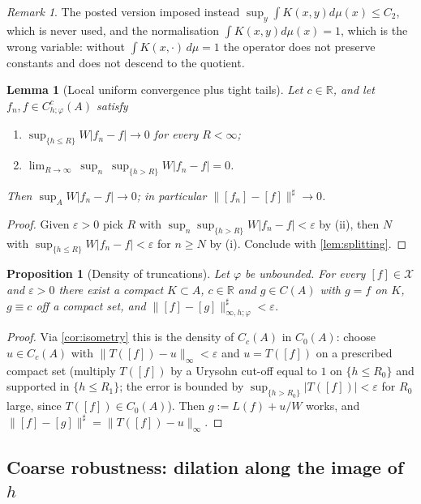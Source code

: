 \documentclass[11pt,a4paper]{article}
\numberwithin{equation}{section}
\theoremstyle{plain}
\newtheorem{proposition}[theorem]{Proposition}
\newtheorem{lemma}[theorem]{Lemma}
\theoremstyle{definition}
\theoremstyle{remark}
\newtheorem{remark}[theorem]{Remark}
\newcommand{\R}{\mathbb{R}}
\newcommand{\Cz}{C_0}
\newcommand{\Xdec}{\mathcal{X}}
\begin{document}
\begin{remark}
The posted version imposed instead $\sup_y\int K(x,y)d\mu(x)\le C_2$, which is never used,
and the normalisation $\int K(x,y)d\mu(x)=1$, which is the wrong variable: without
$\int K(x,\cdot)\,d\mu=1$ the operator does not preserve constants and does not descend
to the quotient.
\end{remark}

\begin{lemma}[Local uniform convergence plus tight tails]\label{lem:dini}
Let $c\in\R$, and let $f_n,f\in C^{c}_{h;\varphi}(A)$ satisfy
\begin{enumerate}
\item[(i)] $\sup_{\{h\le R\}}W|f_n-f|\to0$ for every $R<\infty$;
\item[(ii)] $\lim_{R\to\infty}\ \sup_{n}\ \sup_{\{h>R\}}W|f_n-f|=0$.
\end{enumerate}
Then $\sup_AW|f_n-f|\to0$; in particular $\|[f_n]-[f]\|^{\sharp}\to0$.
\end{lemma}

\begin{proof}
Given $\varepsilon>0$ pick $R$ with $\sup_n\sup_{\{h>R\}}W|f_n-f|<\varepsilon$ by (ii),
then $N$ with $\sup_{\{h\le R\}}W|f_n-f|<\varepsilon$ for $n\ge N$ by (i). Conclude with
\cref{lem:splitting}.
\end{proof}

\begin{proposition}[Density of truncations]\label{prop:truncation}
Let $\varphi$ be unbounded. For every $[f]\in\Xdec$ and $\varepsilon>0$ there exist a
compact $K\subset A$, $c\in\R$ and $g\in C(A)$ with $g=f$ on $K$, $g\equiv c$ off a compact
set, and $\|[f]-[g]\|^{\sharp}_{\infty,h;\varphi}<\varepsilon$.
\end{proposition}

\begin{proof}
Via \cref{cor:isometry} this is the density of $C_c(A)$ in $\Cz(A)$: choose
$u\in C_c(A)$ with $\|T([f])-u\|_\infty<\varepsilon$ and $u=T([f])$ on a prescribed
compact set (multiply $T([f])$ by a Urysohn cut-off equal to $1$ on $\{h\le R_0\}$ and
supported in $\{h\le R_1\}$; the error is bounded by $\sup_{\{h>R_0\}}|T([f])|<\varepsilon$
for $R_0$ large, since $T([f])\in\Cz(A)$). Then $g:=L(f)+u/W$ works, and
$\|[f]-[g]\|^{\sharp}=\|T([f])-u\|_\infty$.
\end{proof}

\subsection{Coarse robustness: dilation along the image of $h$}
\end{document}
